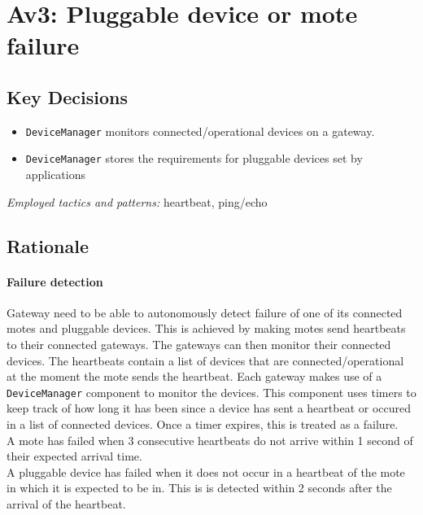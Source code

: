 \section{Av3: Pluggable device or mote failure}


    \subsection*{Key Decisions}


    \begin{itemize}
    	\item \texttt{DeviceManager} monitors connected/operational devices on a gateway.
    	\item \texttt{DeviceManager} stores the requirements for pluggable devices set by applications
    \end{itemize}
    \emph{Employed tactics and patterns:} heartbeat, ping/echo

    \subsection*{Rationale}
        \paragraph{Failure detection}
            Gateway need to be able to autonomously detect failure of one of its
            connected motes and pluggable devices. This is achieved by making motes
            send heartbeats to their connected gateways. The gateways can
            then monitor their connected devices. The heartbeats contain a list
            of devices that are connected/operational at the moment the mote sends
            the heartbeat. Each gateway makes use of a \texttt{DeviceManager}
            component to monitor the devices. This component uses timers to keep track
            of how long it has been since a device has sent a heartbeat or occured in
            a list of connected devices. Once a timer expires, this is treated as
            a failure. \\

            A mote has failed when 3 consecutive heartbeats do not arrive within 1
            second of their expected arrival time. \\
            A pluggable device has failed when it does not occur in a heartbeat of the
            mote in which it is expected to be in. This is is detected within 2
            seconds after the arrival of the heartbeat.

